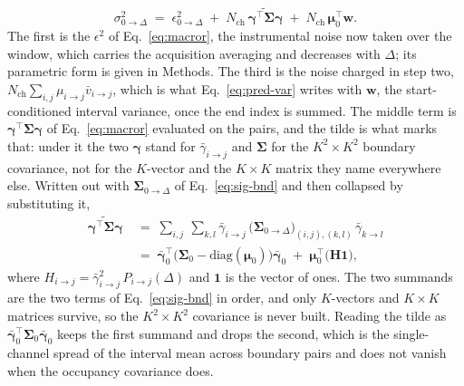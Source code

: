 \begin{appendixbox}
\begin{equation}
  \sigma^2_{0\to\Delta} \;=\; \epsilon^2_{0\to\Delta}
  \;+\; N_{\mathrm{ch}}\,\widetilde{\bm{\gamma}^\top\bm{\Sigma}\bm{\gamma}}
  \;+\; N_{\mathrm{ch}}\,\bm{\mu}_0^\top\mathbf{w}.
  \label{eq:pred-var}
\end{equation}
The first is the $\epsilon^2$ of Eq.~\ref{eq:macror}, the instrumental noise now taken over the
window, which carries the acquisition averaging and decreases with $\Delta$; its parametric
form is given in Methods. The third is the noise charged in step two,
$N_{\mathrm{ch}}\sum_{i,j}\mu_{i\to j}\bar{v}_{i\to j}$, which
is what Eq.~\ref{eq:pred-var} writes with $\mathbf{w}$, the
start-conditioned interval variance, once the end index is summed. The middle term is
$\bm{\gamma}^\top\bm{\Sigma}\bm{\gamma}$ of Eq.~\ref{eq:macror} evaluated on the pairs, and the
tilde is what marks that: under it the two $\bm{\gamma}$ stand for
$\bar{\gamma}_{i\to j}$ and $\bm{\Sigma}$ for the $K^2\times K^2$ boundary covariance,
not for the $K$-vector and the $K\times K$ matrix they name everywhere else. Written out with $\bm{\Sigma}_{0\to\Delta}$
of Eq.~\ref{eq:sig-bnd} and then collapsed by substituting it,
\begin{align}
  \widetilde{\bm{\gamma}^\top\bm{\Sigma}\bm{\gamma}}
  &\;=\; \sum_{i,j}\ \sum_{k,l}
    \bar{\gamma}_{i\to j}\,
    \bigl(\bm{\Sigma}_{0\to\Delta}\bigr)_{(i,j),(k,l)}\,
    \bar{\gamma}_{k\to l} \nonumber\\[2pt]
  &\;=\; \bar{\bm{\gamma}}_0^\top\bigl(\bm{\Sigma}_0-\mathrm{diag}(\bm{\mu}_0)\bigr)\bar{\bm{\gamma}}_0
    \;+\; \bm{\mu}_0^\top\bigl(\mathbf{H}\mathbf{1}\bigr),
  \label{eq:tilde}
\end{align}
where $H_{i\to j} = \bar{\gamma}^2_{i\to j}\,P_{i\to j}(\Delta)$ and $\mathbf{1}$
is the vector of ones. The two summands are the two terms of Eq.~\ref{eq:sig-bnd} in order,
and only $K$-vectors and $K\times K$ matrices survive, so the $K^2\times K^2$ covariance is
never built. Reading the tilde as
$\bar{\bm{\gamma}}_0^\top\bm{\Sigma}_0\bar{\bm{\gamma}}_0$ keeps the first summand and drops
the second, which is the single-channel spread of the interval mean across boundary pairs and
does not vanish when the occupancy covariance does.


\end{appendixbox}
